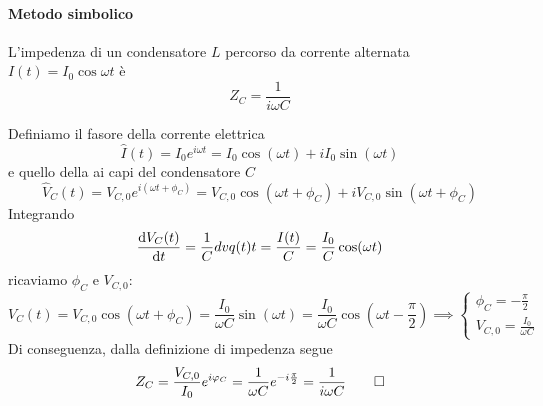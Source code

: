 \paragraph{Metodo simbolico}
\begin{proposition}
	L'impedenza di un condensatore $L$ percorso da corrente alternata $I(t)=I_0\cos\omega t$ è
	\begin{equation}
		Z_C=\frac{1}{i \omega C}
	\end{equation}
\end{proposition}
\begin{demonstration} %
	Definiamo il fasore della corrente elettrica
	\begin{equation*}
		\hat{I}(t)=I_0e^{i\omega t}=I_0\cos(\omega t)+iI_0\sin(\omega t)
	\end{equation*}
	e quello della \ddp ai capi del condensatore $C$
	\begin{equation*}
		\hat{V}_C(t)=V_{C,0}e^{i(\omega t+\phi_C)}=V_{C,0}\cos(\omega t+\phi_C)+iV_{C,0}\sin(\omega t+\phi_C)
	\end{equation*}
	Integrando
	\begin{equation*}
		\dv{V_C(t)}{t}=\frac{1}{C}dv{q(t)}{t}=\frac{I(t)}{C}=\frac{I_0}{C}\cos(\omega t)
	\end{equation*}
	ricaviamo $\phi_C$ e $V_{C,0}$:
	\begin{equation*}
		V_C(t)=V_{C,0}\cos(\omega t+\phi_C)=\frac{I_0}{\omega C}\sin(\omega t)=\frac{I_0}{\omega C}\cos(\omega t-\frac{\pi}{2})\implies \begin{cases}
			\phi_C=-\frac{\pi}{2}\\
			V_{C,0}=\frac{I_0}{\omega C}
		\end{cases} 
	\end{equation*}
	Di conseguenza, dalla definizione di impedenza segue
	\begin{equation*}
		Z_C=\frac{V_{C,0}}{I_0}e^{i\oldphi_C}=\frac{1}{\omega C}e^{-i\frac{\pi}{2}}=\frac{1}{i \omega C}\qedhere
	\end{equation*}
\end{demonstration}
